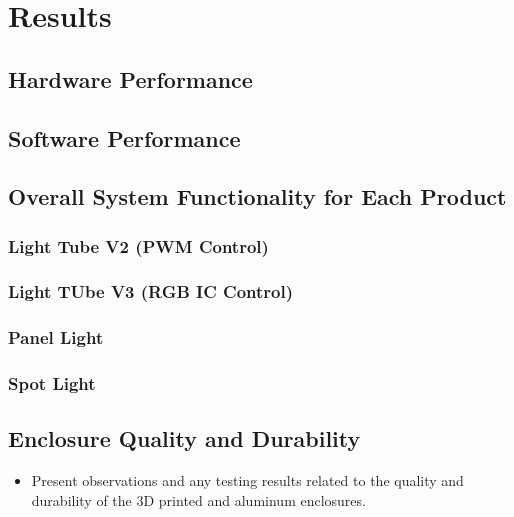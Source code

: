 \section{Results}
\label{sec:results}
\subsection{Hardware Performance}
\subsection{Software Performance}
\subsection{Overall System Functionality for Each Product}
\subsubsection{Light Tube V2 (PWM Control)}
\subsubsection{Light TUbe V3 (RGB IC Control)}
\subsubsection{Panel Light}
\subsubsection{Spot Light}
\subsection{Enclosure Quality and Durability}
\label{subsec:enclosure_quality}
\begin{itemize}
	\item Present observations and any testing results related to the quality and durability of the 3D printed and aluminum enclosures.
\end{itemize}